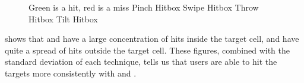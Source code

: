 \begin{figure}[H]
	\caption{
		Green is a hit, red is a miss
		\protect{} Pinch Hitbox
		\protect{} Swipe Hitbox
		\protect{} Throw Hitbox
		\protect{} Tilt Hitbox
	}
	\label{fig:thitboxes}
\end{figure}

 shows that \swipe and \throw have a large concentration of hits inside the target cell, \pinch and \tilt have quite a spread of hits outside the target cell. These figures, combined with the standard deviation of each technique, tells us that users are able to hit the targets more consistently with \swipe and \throw.

